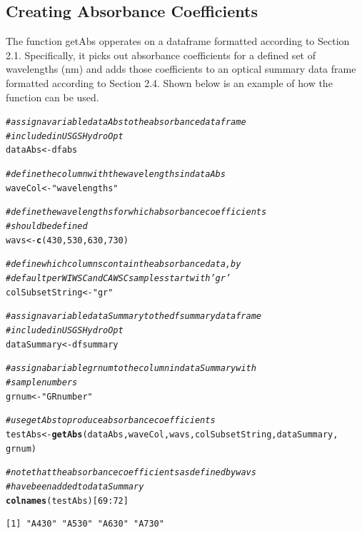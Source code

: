 \documentclass[a4paper,11pt]{article}\usepackage[]{graphicx}\usepackage[]{color}
\makeatletter
\newcommand{\hlnum}[1]{\textcolor[rgb]{0.686,0.059,0.569}{#1}}%
\newcommand{\hlstr}[1]{\textcolor[rgb]{0.192,0.494,0.8}{#1}}%
\newcommand{\hlcom}[1]{\textcolor[rgb]{0.678,0.584,0.686}{\textit{#1}}}%
\newcommand{\hlopt}[1]{\textcolor[rgb]{0,0,0}{#1}}%
\newcommand{\hlstd}[1]{\textcolor[rgb]{0.345,0.345,0.345}{#1}}%
\newcommand{\hlkwb}[1]{\textcolor[rgb]{0.69,0.353,0.396}{#1}}%
\newcommand{\hlkwd}[1]{\textcolor[rgb]{0.737,0.353,0.396}{\textbf{#1}}}%
\newenvironment{kframe}{%
 \def\at@end@of@kframe{}%
 \ifinner\ifhmode%
  \def\at@end@of@kframe{\end{minipage}}%
  \begin{minipage}{\columnwidth}%
 \fi\fi%
 \def\FrameCommand##1{\hskip\@totalleftmargin \hskip-\fboxsep
 \colorbox{shadecolor}{##1}\hskip-\fboxsep
     \hskip-\linewidth \hskip-\@totalleftmargin \hskip\columnwidth}%
 \MakeFramed {\advance\hsize-\width
   \@totalleftmargin\z@ \linewidth\hsize
   \@setminipage}}%
 {\par\unskip\endMakeFramed%
 \at@end@of@kframe}
\newenvironment{knitrout}{}{} %
\makeatother
\begin{document}
\subsection{Creating Absorbance Coefficients}
The function getAbs opperates on a dataframe formatted according to Section 2.1. Specifically, it picks out absorbance coefficients for a defined set of wavelengths (nm) and adds those coefficients to an optical summary data frame formatted according to Section 2.4. Shown below is an example of how the function can be used.

\begin{knitrout}
\color{fgcolor}\begin{kframe}
\begin{alltt}
\hlcom{# assign a variable dataAbs to the absorbance dataframe}
\hlcom{# included in USGSHydroOpt}
\hlstd{dataAbs} \hlkwb{<-} \hlstd{dfabs}

\hlcom{# define the column with the wavelengths in dataAbs}
\hlstd{waveCol} \hlkwb{<-} \hlstr{"wavelengths"}

\hlcom{# define the wavelengths for which absorbance coefficients}
\hlcom{# should be defined}
\hlstd{wavs} \hlkwb{<-} \hlkwd{c}\hlstd{(}\hlnum{430}\hlstd{,} \hlnum{530}\hlstd{,} \hlnum{630}\hlstd{,} \hlnum{730}\hlstd{)}

\hlcom{# define which columns contain the absorbance data, by}
\hlcom{# default per WI WSC and CA WSC samples start with 'gr'}
\hlstd{colSubsetString} \hlkwb{<-} \hlstr{"gr"}

\hlcom{# assign a variable dataSummary to the dfsummary dataframe}
\hlcom{# included in USGSHydroOpt}
\hlstd{dataSummary} \hlkwb{<-} \hlstd{dfsummary}

\hlcom{# assign a bariable grnum to the column in dataSummary with}
\hlcom{# sample numbers}
\hlstd{grnum} \hlkwb{<-} \hlstr{"GRnumber"}

\hlcom{# use getAbs to produce absorbance coefficients}
\hlstd{testAbs} \hlkwb{<-} \hlkwd{getAbs}\hlstd{(dataAbs, waveCol, wavs, colSubsetString, dataSummary,}
    \hlstd{grnum)}

\hlcom{# note that the absorbance coefficients as defined by wavs}
\hlcom{# have been added to dataSummary}
\hlkwd{colnames}\hlstd{(testAbs)[}\hlnum{69}\hlopt{:}\hlnum{72}\hlstd{]}
\end{alltt}
\begin{verbatim}
[1] "A430" "A530" "A630" "A730"
\end{verbatim}
\end{kframe}
\end{knitrout}
\end{document}
